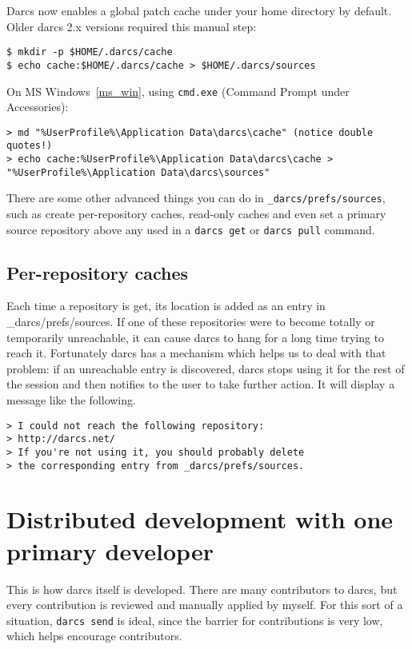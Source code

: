 Darcs now enables a global patch cache under your home directory by default.
Older darcs 2.x versions required this manual step:

\begin{verbatim}
$ mkdir -p $HOME/.darcs/cache
$ echo cache:$HOME/.darcs/cache > $HOME/.darcs/sources
\end{verbatim}

On MS Windows~\ref{ms_win}, using \verb|cmd.exe| (Command Prompt under Accessories):

\begin{verbatim}
> md "%UserProfile%\Application Data\darcs\cache" (notice double quotes!)
> echo cache:%UserProfile%\Application Data\darcs\cache > "%UserProfile%\Application Data\darcs\sources"
\end{verbatim}

There are some other advanced things you can do in \verb!_darcs/prefs/sources!,
such as create per-repository caches, read-only caches and even set a
primary source repository above any used in a \verb|darcs get| or 
\verb|darcs pull| command.

\subsection{Per-repository caches}
Each time a repository is get, its location is added as an
entry in \_darcs/prefs/sources.  If one of these repositories were to
become totally or temporarily unreachable, it can cause darcs to hang
for a long time trying to reach it.  Fortunately darcs has a mechanism
which helps us to deal with that problem: if an unreachable entry is
discovered, darcs stops using it for the rest of the session and then
notifies to the user to take further action. It will display a message
like the following.\\
\begin{verbatim}
> I could not reach the following repository:
> http://darcs.net/
> If you're not using it, you should probably delete
> the corresponding entry from _darcs/prefs/sources.
\end{verbatim}

\section{Distributed development with one primary developer}
\label{darcs-development-practices}

This is how darcs itself is developed.  There are many contributors to
darcs, but every contribution is reviewed and manually applied by myself.
For this sort of a situation, \verb|darcs send| is ideal, since the barrier for
contributions is very low, which helps encourage contributors.

